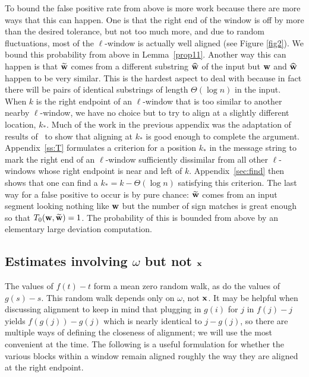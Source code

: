 \documentclass[final,12pt]{colt2018} %
\newcommand{\1}{\mathbf{1}}
\newcommand{\wt}{\widetilde}
\newcommand{\wh}{\widehat}
\def\wtt{{\wt {\bf w}}}
\def\x{{\bf x}}
\def\w{{\bf w}}
\begin{document}
To bound the false positive rate from above is more work because
there are more ways that this can happen.  One is that the right
end of the window is off by more than the desired tolerance, but
not too much more, and due to random fluctuations, most of the
$\ell$-window is actually well aligned (see Figure \ref{fig2}).  We bound this probability
from above in Lemma~\ref{prop11}.  Another way this can happen is
that $\wtt$ comes from a different substring $\wh\w$ of the
input but $\w$ and $\wh\w$ happen to be very similar.  This is
the hardest aspect to deal with because in fact there will
be pairs of identical substrings of length $\Theta (\log n)$
in the input.  When $k$ is the right endpoint of an $\ell$-window
that is too similar to another nearby $\ell$-window, we have
no choice but to try to align at a slightly different location, $k_*$.
Much of the work in the previous appendix was the adaptation of
results of~\citet*{PZ17,NP16,DOS16} to show that aligning at $k_*$ is
good enough to complete the argument.  Appendix~\ref{ss:T} formulates
a criterion for a position $k_*$ in the message string to mark
the right end of an $\ell$-window sufficiently dissimilar from all other
$\ell$-windows whose right endpoint is near and left of $k$.  Appendix~\ref{sec:find}
then shows that one can find a $k_* = k - \Theta (\log n)$ satisfying
this criterion.  The last way for a false positive to occur
is by pure chance: $\wtt$ comes from an input segment looking
nothing like $\w$ but the number of sign matches is great enough
so that $T_0 (\w,\wtt)= 1$.  The probability of this is bounded
from above by an elementary large deviation computation.

\subsection{Estimates involving $\omega$ but not $\x$} \label{ss:omega}

The values of $f(t) - t$ form a mean zero random walk, as do the
values of $g(s) - s$.  This random walk depends only on $\omega$,
not $\x$.
It may be helpful when discussing alignment to keep in mind that
plugging in $g(i)$ for $j$ in $f(j) - j$ yields $f(g(j)) - g(j)$
which is nearly identical to $j - g(j)$, so there are multiple ways
of defining the closeness of alignment; we will use the most
convenient at the time.  The following is a useful formulation
for whether the various blocks within a window remain aligned
roughly the way they are aligned at the right endpoint.
\end{document}
